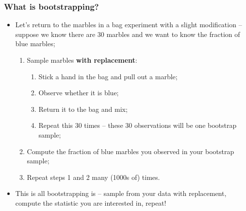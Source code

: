 \documentclass[aspectratio=169]{beamer}
\theoremstyle{principle}
\begin{document}
\begin{frame}
\frametitle{What is bootstrapping?}

\begin{itemize}
\item Let's return to the marbles in a bag experiment with a slight modification -- suppose we know there are 30 marbles and we want to know the fraction of blue marbles;
\begin{enumerate}
\item Sample marbles \textbf{with replacement}:
\begin{enumerate}
\item Stick a hand in the bag and pull out a marble;
\item Observe whether it is blue; 
\item Return it to the bag and mix; 
\item Repeat this 30 times -- these 30 observations will be one bootstrap sample;
\end{enumerate}
\item Compute the fraction of blue marbles you observed in your bootstrap sample;
\item Repeat steps 1 and 2 many (1000s of) times.
\end{enumerate} 

\bigskip

\item This is all bootstrapping is -- sample from your data with replacement, compute the statistic you are interested in, repeat!

\end{itemize}

\end{frame}
\end{document}
